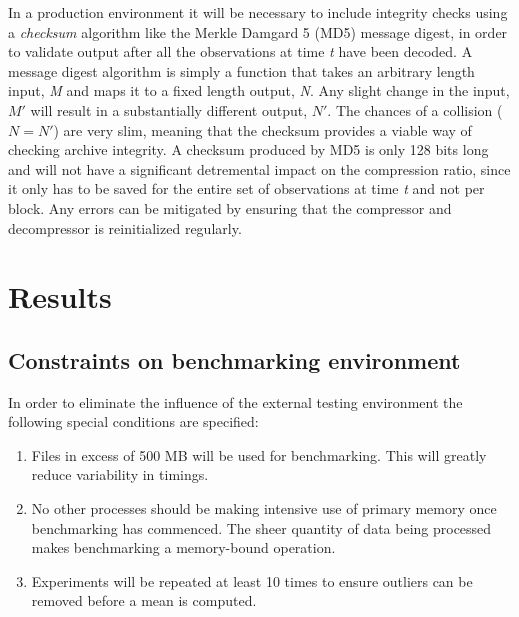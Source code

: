   In a production environment it will be necessary to include integrity checks using a \textit{checksum} algorithm like the Merkle Damgard 5 (MD5) message digest, in order to validate output after all the observations
  at time \textit{t} have been decoded. A message digest algorithm is simply a function that takes an arbitrary length input, \textit{M} and maps it to a fixed length output, 
  \textit{N}. Any slight change in the input, $M'$ will result in a substantially different output, $N'$. The chances of a collision ($N = N'$) are very slim, meaning that 
  the checksum provides a viable way of checking archive integrity. A checksum produced by MD5 is only 128 bits long and will not have a significant detremental impact on the
  compression ratio, since it only has to be saved for the entire set of observations at time \textit{t} and not per block. Any errors can be mitigated by ensuring that the 
  compressor and decompressor is reinitialized regularly.
\section{Results}
\subsection{Constraints on benchmarking environment}
In order to eliminate the influence of the external testing environment the following special conditions are specified:
\begin{enumerate}
 \item Files in excess of 500 MB will be used for benchmarking. This will greatly reduce variability in timings.
 \item No other processes should be making intensive use of primary memory once benchmarking has commenced. The sheer quantity of data being processed makes benchmarking a memory-bound operation.
 \item Experiments will be repeated at least 10 times to ensure outliers can be removed before a mean is computed.
\end{enumerate}
